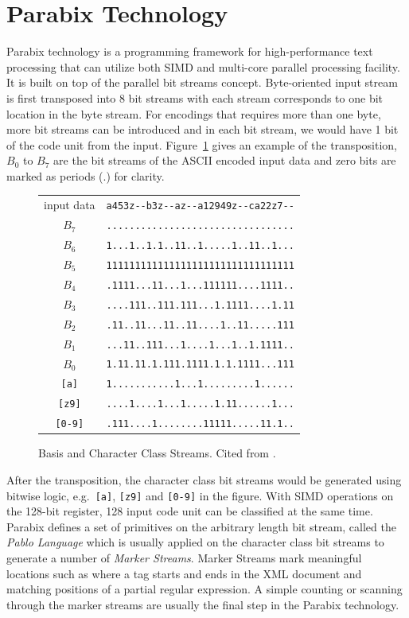 \section{Parabix Technology}
Parabix technology is a programming framework for high-performance text processing that can utilize both SIMD and multi-core parallel processing facility. It is built on top of the parallel bit streams concept. Byte-oriented input stream is first transposed into 8 bit streams with each stream corresponds to one bit location in the byte stream. For encodings that requires more than one byte, more bit streams can be introduced and in each bit stream, we would have 1 bit of the code unit from the input. Figure~\ref{figure:streams} gives an example of the transposition, $B_0$ to $B_7$ are the bit streams of the ASCII encoded input data and zero bits are marked as periods (.) for clarity.

\begin{figure}[tbh]
\begin{center}
\begin{tabular}{cr}\\
input data  & \verb`a453z--b3z--az--a12949z--ca22z7--`\\
$B_7$ & \verb`.................................`\\
$B_6$ & \verb`1...1..1.1..11..1.....1..11..1...`\\
$B_5$ & \verb`111111111111111111111111111111111`\\
$B_4$ & \verb`.1111...11...1...111111....1111..`\\
$B_3$ & \verb`....111..111.111...1.1111....1.11`\\
$B_2$ & \verb`.11..11...11..11....1..11.....111`\\
$B_1$ & \verb`...11..111...1....1...1..1.1111..`\\
$B_0$ & \verb`1.11.11.1.111.1111.1.1.1111...111`\\
\verb:[a]: & \verb`1...........1...1.........1......`\\
\verb:[z9]: & \verb`....1....1...1.....1.11......1...`\\
\verb:[0-9]: & \verb`.111....1........11111.....11.1..`
\end{tabular}
\end{center}
\caption[Basis and Character Class Streams]{Basis and Character Class Streams. Cited from \cite{rob_regex}.}
\label{figure:streams}
\end{figure}

After the transposition, the character class bit streams would be generated using bitwise logic, e.g.\ \verb:[a]:, \verb:[z9]: and \verb:[0-9]: in the figure. With SIMD operations on the 128-bit register, 128 input code unit can be classified at the same time. Parabix defines a set of primitives on the arbitrary length bit stream, called the \textit{Pablo Language} which is usually applied on the character class bit streams to generate a number of \textit{Marker Streams}. Marker Streams mark meaningful locations such as where a tag starts and ends in the XML document and matching positions of a partial regular expression. A simple counting or scanning through the marker streams are usually the final step in the Parabix technology.

